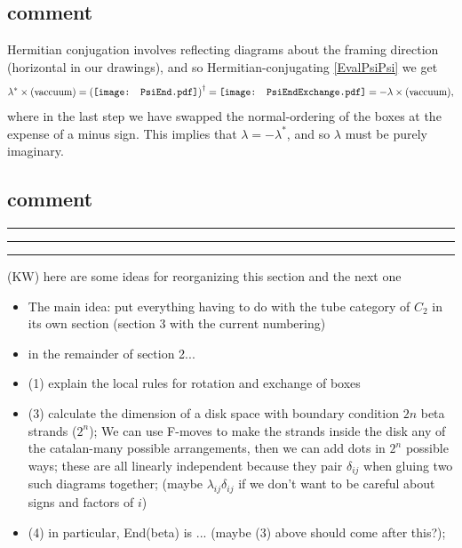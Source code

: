 \documentclass[12pt,a4paper]{article}
\newcommand{\kw}[1]{{\color{kwcolor}\footnotesize{(KW) #1}}}
\newcommand{\kwsep}{\bigskip\hrule\medskip\hrule\medskip\hrule\bigskip}
\newcommand{\PsiEnd}{\mathord{\vcenter{\hbox{\texttt{[image: PsiEnd.pdf]}}}}}
\newcommand{\PsiEndExchange}{\mathord{\vcenter{\hbox{\texttt{[image: PsiEndExchange.pdf]}}}}}
\begin{document}
 



 
\subsection{comment}
Hermitian conjugation involves reflecting diagrams about the framing direction (horizontal in our drawings), and so Hermitian-conjugating \eqref{EvalPsiPsi} we get 
\begin{align}
\lambda^{*} \times \text{(vaccuum)} = \left( \PsiEnd \right) ^{\dagger}  = \PsiEndExchange = - \lambda \times \text{(vaccuum)},
\label{phase}
\end{align}
where in the last step we have swapped the normal-ordering of the boxes at the expense of a minus sign. 
This implies that $\lambda = - \lambda^*$, and so $\lambda$ must be purely imaginary. 
 
 

 
\subsection{comment}
\kwsep

\kw{here are some ideas for reorganizing this section and the next one}

\begin{itemize}
\item The main idea: put everything having to do with the tube category of $C_2$ in its own section (section 3 with
the current numbering)
\item in the remainder of section 2...
\item (1) explain the local rules for rotation and exchange of boxes
\item (3) calculate the dimension of a disk space with boundary condition $2n$ beta strands ($2^n$);
We can use F-moves to make the strands inside the disk any of the catalan-many possible arrangements, 
then we can add dots in $2^n$ possible ways; these are all linearly independent because they pair $\delta_{ij}$
when gluing two such diagrams together; (maybe $\lambda_{ij}\delta_{ij}$ if we don't want to 
be careful about signs and factors of $i$)
\item (4) in particular, End(beta) is ... (maybe (3) above should come after this?); 
\end{itemize}
 
\end{document}
